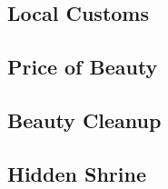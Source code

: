 

\subsection{Local Customs}


\subsection{Price of Beauty}


\subsection{Beauty Cleanup}

\subsection{Hidden Shrine}

